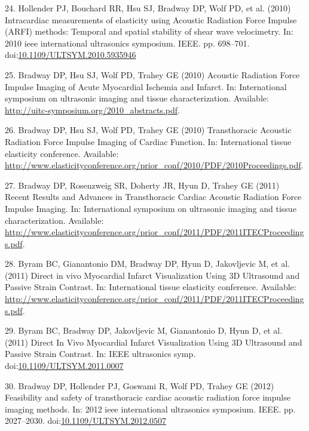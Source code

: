 \documentclass[
]{article}
\newenvironment{cslreferences}%
  {}%
  {\par}
\begin{document}
\begin{cslreferences}
\leavevmode\hypertarget{ref-Hollender2010}{}%
24. Hollender PJ, Bouchard RR, Hsu SJ, Bradway DP, Wolf PD, et al.
(2010) Intracardiac measurements of elasticity using Acoustic Radiation
Force Impulse (ARFI) methods: Temporal and spatial stability of shear
wave velocimetry. In: 2010 ieee international ultrasonics symposium.
IEEE. pp. 698--701.
doi:\href{https://doi.org/10.1109/ULTSYM.2010.5935946}{10.1109/ULTSYM.2010.5935946}

\leavevmode\hypertarget{ref-Bradway2010}{}%
25. Bradway DP, Hsu SJ, Wolf PD, Trahey GE (2010) Acoustic Radiation
Force Impulse Imaging of Acute Myocardial Ischemia and Infarct. In:
International symposium on ultrasonic imaging and tissue
characterization. Available:
\url{http://uitc-symposium.org/2010_abstracts.pdf}.

\leavevmode\hypertarget{ref-Bradway2010b}{}%
26. Bradway DP, Hsu SJ, Wolf PD, Trahey GE (2010) Transthoracic Acoustic
Radiation Force Impulse Imaging of Cardiac Function. In: International
tissue elasticity conference. Available:
\url{http://www.elasticityconference.org/prior_conf/2010/PDF/2010Proceedings.pdf}.

\leavevmode\hypertarget{ref-Bradway2011}{}%
27. Bradway DP, Rosenzweig SR, Doherty JR, Hyun D, Trahey GE (2011)
Recent Results and Advances in Transthoracic Cardiac Acoustic Radiation
Force Impulse Imaging. In: International symposium on ultrasonic imaging
and tissue characterization. Available:
\url{http://www.elasticityconference.org/prior_conf/2011/PDF/2011ITECProceedings.pdf}.

\leavevmode\hypertarget{ref-Byram2011}{}%
28. Byram BC, Gianantonio DM, Bradway DP, Hyun D, Jakovljevic M, et al.
(2011) Direct in vivo Myocardial Infarct Visualization Using 3D
Ultrasound and Passive Strain Contrast. In: International tissue
elasticity conference. Available:
\url{http://www.elasticityconference.org/prior_conf/2011/PDF/2011ITECProceedings.pdf}.

\leavevmode\hypertarget{ref-Byram2011b}{}%
29. Byram BC, Bradway DP, Jakovljevic M, Gianantonio D, Hyun D, et al.
(2011) Direct In Vivo Myocardial Infarct Visualization Using 3D
Ultrasound and Passive Strain Contrast. In: IEEE ultrasonics symp.
doi:\href{https://doi.org/10.1109/ULTSYM.2011.0007}{10.1109/ULTSYM.2011.0007}

\leavevmode\hypertarget{ref-Bradway2012}{}%
30. Bradway DP, Hollender PJ, Goswami R, Wolf PD, Trahey GE (2012)
Feasibility and safety of transthoracic cardiac acoustic radiation force
impulse imaging methods. In: 2012 ieee international ultrasonics
symposium. IEEE. pp. 2027--2030.
doi:\href{https://doi.org/10.1109/ULTSYM.2012.0507}{10.1109/ULTSYM.2012.0507}


\end{cslreferences}
\end{document}
